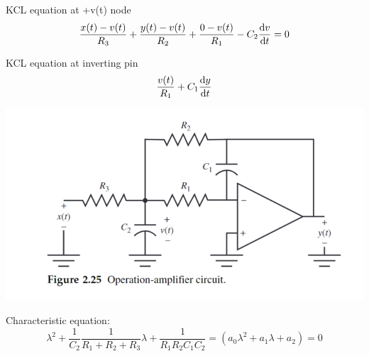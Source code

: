 KCL equation at +v(t) node
\[\frac{x(t) - v(t)}{R_3} + \frac{y(t) - v(t)}{R_2} + \frac{0-v(t)}{R_1} - C_2\odv{v}{t} = 0\]

KCL equation at inverting pin
\[\frac{v(t)}{R_1} + C_1\odv{y}{t}\]

\begin{example}
    \center
    \includegraphics{images/op amp circuit.png}
\end{example}

Characteristic equation:
\[\lambda^2 + \frac{1}{C_2}{\frac{1}{R_1 + R_2 + R_3}}\lambda + \frac{1}{R_1R_2C_1C_2} = (a_0\lambda^2 + a_1\lambda + a_2) = 0\]




